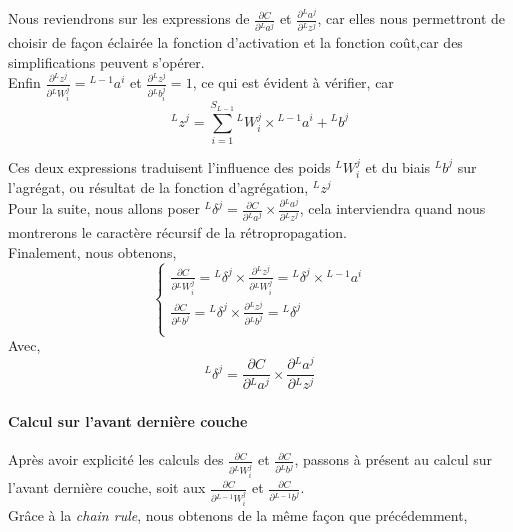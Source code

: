 \documentclass[10pt,a4paper]{report}
\newcommand{\lexp}[1]{\phantom{}^{#1}}
\newcommand{\elem}[4]{\lexp{#2}#1^{#3}_{#4}}
\begin{document}
				Nous reviendrons sur les expressions de $\frac{\partial C}{\partial \elem{a}{L}{j}{}}$ et $\frac{\partial \elem{a}{L}{j}{}}{\partial \elem{z}{L}{j}{}}$, car elles nous permettront de choisir de façon éclairée la fonction d'activation et la fonction coût,car des simplifications peuvent s'opérer.\\
				
				Enfin $\frac{\partial \elem{z}{L}{j}{}}{\partial \elem{W}{L}{j}{i}}=\elem{a}{L-1}{i}{}$ et $\frac{\partial \elem{z}{L}{j}{}}{\partial \elem{b}{L}{j}{i}} = 1$, ce qui est évident à vérifier, car 
				$$\elem{z}{L}{j}{} = \sum_{i=1}^{S_{L-1}}{\elem{W}{L}{j}{i} \times \elem{a}{L-1}{i}{}} + \elem{b}{L}{j}{}$$
				
				Ces deux expressions traduisent l'influence des poids $\elem{W}{L}{j}{i}$ et du biais $\elem{b}{L}{j}{}$ sur l'agrégat, ou résultat de la fonction d'agrégation, $\elem{z}{L}{j}{}$\\
				
				Pour la suite, nous allons poser $\elem{\delta}{L}{j}{} = \frac{\partial C}{\partial \elem{a}{L}{j}{}} \times \frac{\partial \elem{a}{L}{j}{}}{\partial \elem{z}{L}{j}{}}$, cela interviendra quand nous montrerons le caractère récursif de la rétropropagation.\\
				
				Finalement, nous obtenons,
				$$\left\{
				\begin{array}{l}
					\frac{\partial C}{\partial \elem{W}{L}{j}{i}} = \elem{\delta}{L}{j}{} \times \frac{\partial \elem{z}{L}{j}{}}{\partial \elem{W}{L}{j}{i}} = \elem{\delta}{L}{j}{} \times \elem{a}{L-1}{i}{} \\
					
					\frac{\partial C}{\partial \elem{b}{L}{j}{}} = \elem{\delta}{L}{j}{} \times \frac{\partial \elem{z}{L}{j}{}}{\partial \elem{b}{L}{j}{}} = \elem{\delta}{L}{j}{}\\
				\end{array}
				\right.$$
				Avec,
				$$\elem{\delta}{L}{j}{} = \frac{\partial C}{\partial \elem{a}{L}{j}{}} \times \frac{\partial \elem{a}{L}{j}{}}{\partial \elem{z}{L}{j}{}}$$
				
				\paragraph{Calcul sur l'avant dernière couche}
				
				Après avoir explicité les calculs des $\frac{\partial C}{\partial \elem{W}{L}{j}{i}}$ et $\frac{\partial C}{\partial \elem{b}{L}{j}{}}$, passons à présent au calcul sur l'avant dernière couche, soit aux $\frac{\partial C}{\partial \elem{W}{L-1}{j}{i}}$ et $\frac{\partial C}{\partial \elem{b}{L-1}{j}{}}$.\\
				Grâce à la \emph{chain rule}, nous obtenons de la même façon que précédemment,
				
\end{document}
